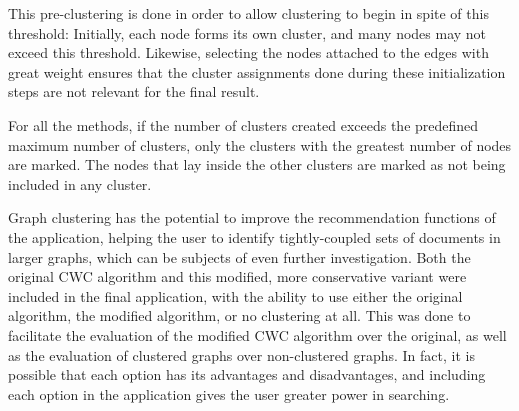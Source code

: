 This pre-clustering is done in order to allow clustering to begin in spite of this threshold:
Initially, each node forms its own cluster, and many nodes may not exceed this threshold. Likewise,
selecting the nodes attached to the edges with great weight ensures that the cluster assignments
done during these initialization steps are not relevant for the final result.


For all the methods, if the number of clusters created exceeds the predefined maximum number of clusters, only the clusters with the greatest number of nodes are marked. The nodes that lay inside the other clusters are marked as not being included in any cluster.

Graph clustering has the potential to improve the recommendation functions of the application, helping the user to identify tightly-coupled sets of documents in larger graphs, which can be subjects of even further investigation. Both the original CWC algorithm and this modified, more conservative variant were included in the final application, with the ability to use either the original algorithm, the modified algorithm, or no clustering at all. This was done to facilitate the evaluation of the modified CWC algorithm over the original, as well as the evaluation of clustered graphs over non-clustered graphs. In fact, it is possible that each option has its advantages and disadvantages, and including each option in the application gives the user greater power in searching.
